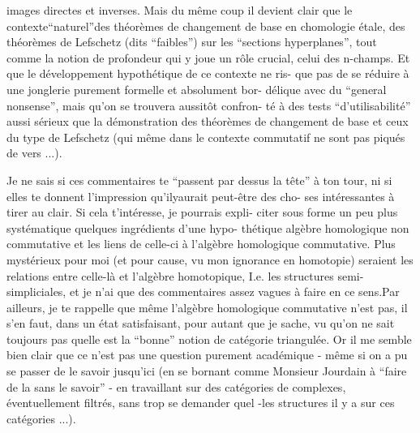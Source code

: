 
images directes et inverses. Mais du même coup il devient clair que le
contexte\hand{|}``naturel''\hand{/}des théorèmes de changement de base en chomologie étale,
des théorèmes  de Lefschetz (dits ``faibles'') sur les ``sections hyperplanes'',
tout comme  la notion de profondeur qui y joue un rôle crucial,   celui
des n-champs. Et que le développement hypothétique de ce contexte\deleted{,} ne ris-%
que pas de se réduire à une jonglerie purement formelle et absolument bor-%
délique avec du ``general nonsense'', mais qu'on se trouvera aussitôt confron-%
té à des tests ``d'utilisabilité'' aussi sérieux que la démonstration des
théorèmes de changement de base et ceux du type de Lefschetz (qui même
dans le contexte commutatif ne sont pas piqués de vers ...). 

Je ne sais si ces commentaires te ``passent par dessus la tête'' à ton
tour, ni si elles te donnent l'impression qu'il\hand{/}y\hand{/}aurait peut-être des cho-%
ses intéressantes à tirer au clair. Si cela t'intéresse, je pourrais expli-%
citer sous forme un peu plus systématique quelques ingrédients d'une hypo-%
thétique algèbre homologique non commutative et les liens de celle-ci à
l'algèbre homologique commutative. Plus mystérieux pour moi (et pour cause,
vu mon ignorance en homotopie) seraient les relations entre celle-là et
l'algèbre homotopique, I.e. les structures semi-simpliciales, et je n'ai
que des commentaires assez vagues à faire en ce sens\hand{(*)}.Par ailleurs, je te
rappelle que même l'algèbre homologique  commutative n'est pas, il s'en
faut, dans un état satisfaisant, pour autant que je sache, vu qu'on ne sait
 toujours pas quelle est la ``bonne'' notion de catégorie triangulée\hand{\unsure{(*)}}. Or il me
semble bien clair que ce n'est pas une question purement académique - même
si on a pu se passer de le savoir jusqu'ici (en se bornant comme Monsieur
Jourdain à ``faire de la  sans le savoir'' - en travaillant sur des
catégories de complexes, éventuellement filtrés, sans trop se demander quel
-les structures il y a sur ces catégories ...).

